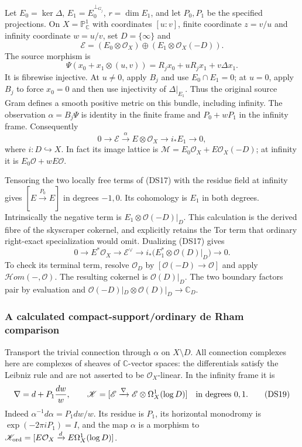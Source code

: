 Let $E_0=\ker\Delta$, $E_1=E_0^{\perp_{G_j}}$, $r=\dim E_1$, and
let $P_0,P_1$ be the specified projections.  On
$X=\mathbb P^1_{\mathbb C}$ with coordinates $[u:v]$, finite coordinate
$z=v/u$ and infinity coordinate $w=u/v$, set $D=\{\infty\}$ and
\[
 \mathscr E=(E_0\otimes\mathcal O_X)
 \oplus(E_1\otimes\mathcal O_X(-D)).
 \tag{DS15}
\]
The source morphism is
\[
 \Psi(x_0+x_1\otimes(u,v))
 =R_jx_0+uR_jx_1+v\Delta x_1.
 \tag{DS16}
\]
It is fibrewise injective.  At $u\ne0$, apply $B_j$ and use
$E_0\cap E_1=0$; at $u=0$, apply $B_j$ to force $x_0=0$ and then
use injectivity of $\Delta|_{E_1}$.  Thus the original source Gram
defines a smooth positive metric on this bundle, including infinity.
The observation $\alpha=B_j\Psi$ is identity in the finite frame and
$P_0+wP_1$ in the infinity frame.  Consequently
\[
 0\to\mathscr E\xrightarrow{\alpha}E\otimes\mathcal O_X
 \to i_*E_1\to0,
 \tag{DS17}
\]
where $i:D\hookrightarrow X$.  In fact its image lattice is
$\mathcal M=E_0\mathcal O_X+E\mathcal O_X(-D)$; at infinity it is
$E_0\mathcal O+wE\mathcal O$.

Tensoring the two locally free terms of (DS17) with the residue field
at infinity gives $[E\xrightarrow{P_0}E]$ in degrees $-1,0$.
Its cohomology is $E_1$ in both degrees.  Intrinsically the negative
term is $E_1\otimes\mathcal O(-D)|_D$.  This calculation is the
derived fibre of the skyscraper cokernel, and explicitly retains the
Tor term that ordinary right-exact specialization would omit.
Dualizing (DS17) gives
\[
 0\to E^*\mathcal O_X\to\mathscr E^\vee
 \to i_*\bigl(E_1^*\otimes\mathcal O(D)|_D\bigr)\to0.
 \tag{DS18}
\]
To check its terminal term, resolve $\mathcal O_D$ by
$[\mathcal O(-D)\to\mathcal O]$ and apply $\mathcal Hom(-,\mathcal O)$.
The resulting cokernel is $\mathcal O(D)|_D$.
The two boundary factors pair by evaluation and
$\mathcal O(-D)|_D\otimes\mathcal O(D)|_D\to\mathbb C_D$.

\subsubsection{A calculated compact-support/ordinary de Rham comparison}

Transport the trivial connection through $\alpha$ on $X\setminus D$.
All connection complexes here are complexes of sheaves of
$\mathbb C$-vector spaces: the differentials satisfy the Leibniz
rule and are not asserted to be $\mathcal O_X$-linear.
In the infinity frame it is
\[
 \nabla=d+P_1\frac{dw}{w},\qquad
 \mathscr K=[\mathscr E\xrightarrow{\nabla}
                 \mathscr E\otimes\Omega_X^1(\log D)]
 \quad\hbox{in degrees }0,1.
 \tag{DS19}
\]
Indeed $\alpha^{-1}d\alpha=P_1dw/w$.  Its residue is $P_1$, its
horizontal monodromy is $\exp(-2\pi iP_1)=I$, and the map $\alpha$
is a morphism to
$\mathscr K_{\rm ord}=[E\mathcal O_X\xrightarrow d
E\Omega_X^1(\log D)]$.

